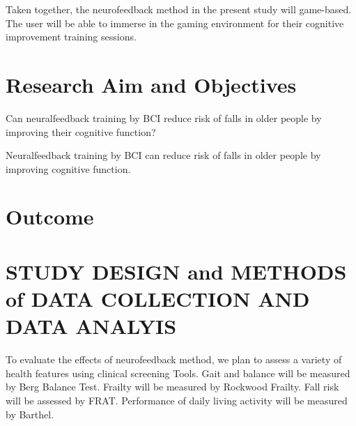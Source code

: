 \documentclass{article}
\begin{document}
Taken together, the neurofeedback method in the present study will game-based. The user will be able to immerse in the gaming environment for their cognitive improvement training sessions. 

\section{Research Aim and Objectives}
\begin{description}[font=$\bullet$~\normalfont\textbf]
\item [Research Question:] Can neuralfeedback training by BCI reduce risk of falls in older people by improving their cognitive function?
\item [Present hypothesis:] Neuralfeedback training by BCI can reduce risk of falls in older people by improving cognitive function. 
\end{description}

\section{Outcome}
\begin{comment}
Aim: To outline potential broad outcomes for the study which will reflect the research question aim(s).
\end{comment}


\section{STUDY DESIGN and METHODS of DATA COLLECTION AND DATA ANALYIS}
\begin{comment}
Aim: To describe the study design. To clearly describe the data collection methods and outline the roles involved in data collection. To clearly describe the data analysis methods.
\end{comment}

To evaluate the effects of neurofeedback method, we plan to assess a variety of health features using clinical screening Tools. Gait and balance will be measured by Berg Balance Test. Frailty will be measured by Rockwood Frailty. Fall risk will be assessed by FRAT. Performance of daily living activity will be measured by Barthel. 


\printbibliography
\end{document}
